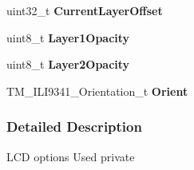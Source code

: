 \begin{DoxyCompactItemize}
\item 
\hypertarget{struct_t_m___i_l_i931___options__t_a4f9f5026f3cd891e5e7d69361ff42e64}{}uint32\+\_\+t {\bfseries Current\+Layer\+Offset}\label{struct_t_m___i_l_i931___options__t_a4f9f5026f3cd891e5e7d69361ff42e64}

\item 
\hypertarget{struct_t_m___i_l_i931___options__t_ad013d8bb99c3830d11c0d7937637a4b1}{}uint8\+\_\+t {\bfseries Layer1\+Opacity}\label{struct_t_m___i_l_i931___options__t_ad013d8bb99c3830d11c0d7937637a4b1}

\item 
\hypertarget{struct_t_m___i_l_i931___options__t_ad72a4d57133b7b38ef6e8d8f634d401e}{}uint8\+\_\+t {\bfseries Layer2\+Opacity}\label{struct_t_m___i_l_i931___options__t_ad72a4d57133b7b38ef6e8d8f634d401e}

\item 
\hypertarget{struct_t_m___i_l_i931___options__t_af9be86bf9bed1588e3040a17eed1b4cb}{}T\+M\+\_\+\+I\+L\+I9341\+\_\+\+Orientation\+\_\+t {\bfseries Orient}\label{struct_t_m___i_l_i931___options__t_af9be86bf9bed1588e3040a17eed1b4cb}

\end{DoxyCompactItemize}


\subsubsection{Detailed Description}
L\+C\+D options Used private 
